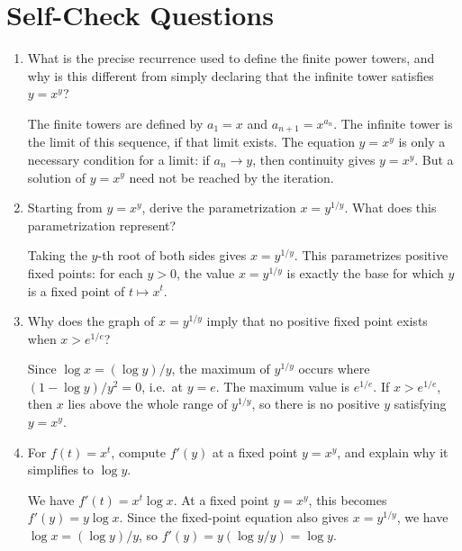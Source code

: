 \documentclass{essay}
\begin{document}
\section{Self-Check Questions}

\begin{enumerate}
  \item What is the precise recurrence used to define the finite power towers,
    and why is this different from simply declaring that the infinite tower
    satisfies \(y=x^{y}\)?
    \begin{answer}
      The finite towers are defined by \(a_{1}=x\) and
      \(a_{n+1}=x^{a_{n}}\). The infinite tower is the limit of this sequence,
      if that limit exists. The equation \(y=x^{y}\) is only a necessary
      condition for a limit: if \(a_{n}\to y\), then continuity gives
      \(y=x^{y}\). But a solution of \(y=x^{y}\) need not be reached by the
      iteration.
    \end{answer}

  \item Starting from \(y=x^{y}\), derive the parametrization
    \(x=y^{1/y}\). What does this parametrization represent?
    \begin{answer}
      Taking the \(y\)-th root of both sides gives \(x=y^{1/y}\). This
      parametrizes positive fixed points: for each \(y>0\), the value
      \(x=y^{1/y}\) is exactly the base for which \(y\) is a fixed point of
      \(t\mapsto x^{t}\).
    \end{answer}

  \item Why does the graph of \(x=y^{1/y}\) imply that no positive fixed point
    exists when \(x>e^{1/e}\)?
    \begin{answer}
      Since \(\log x=(\log y)/y\), the maximum of \(y^{1/y}\) occurs where
      \((1-\log y)/y^{2}=0\), i.e.\ at \(y=e\). The maximum value is
      \(e^{1/e}\). If \(x>e^{1/e}\), then \(x\) lies above the whole range of
      \(y^{1/y}\), so there is no positive \(y\) satisfying \(y=x^{y}\).
    \end{answer}

  \item For \(f(t)=x^{t}\), compute \(f'(y)\) at a fixed point \(y=x^{y}\), and
    explain why it simplifies to \(\log y\).
    \begin{answer}
      We have \(f'(t)=x^{t}\log x\). At a fixed point \(y=x^{y}\), this becomes
      \(f'(y)=y\log x\). Since the fixed-point equation also gives
      \(x=y^{1/y}\), we have \(\log x=(\log y)/y\), so
      \(f'(y)=y(\log y/y)=\log y\).
    \end{answer}


\end{enumerate}
\end{document}
